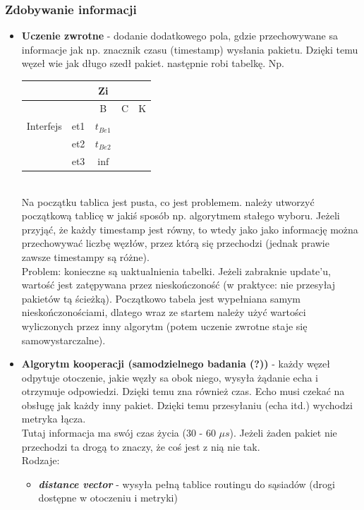 			\subsubsection{Zdobywanie informacji}
				\begin{itemize}
					\item \textbf{Uczenie zwrotne} - dodanie dodatkowego pola, gdzie przechowywane sa informacje jak np. znacznik czasu (timestamp) wysłania pakietu. Dzięki temu węzeł wie jak długo szedł pakiet. następnie robi tabelkę. Np.\\
					\begin{tabular}{|c|c|c|c|c|}
						\hline  &  & Zi &  &  \\
						\hline  &  & B & C & K \\ 
						\hline Interfejs & et1 & $ t_{Be1} $ &  &  \\ 
						\hline  & et2 & $ t_{Be2} $  & & \\ 
						\hline  & et3 & $ \inf $ &  &  \\ 
						\hline 
					\end{tabular}\\
					Na początku tablica jest pusta, co jest problemem. należy utworzyć początkową tablicę w jakiś sposób np. algorytmem stałego wyboru. Jeżeli przyjąć, że każdy timestamp jest równy, to wtedy jako jako informację można przechowywać liczbę węzłów, przez którą się przechodzi (jednak prawie zawsze timestampy są różne). \\
					Problem: konieczne są uaktualnienia tabelki. Jeżeli zabraknie update'u, wartość jest zatępywana przez nieskończoność (w praktyce: nie przesyłaj pakietów tą ścieżką). Początkowo tabela jest wypełniana samym nieskończonościami, dlatego wraz ze startem należy użyć wartości wyliczonych przez inny algorytm (potem uczenie zwrotne staje się samowystarczalne).
					\item \textbf{Algorytm kooperacji (samodzielnego badania (?))} - każdy węzeł odpytuje otoczenie, jakie węzły sa obok niego, wysyła żądanie echa i otrzymuje odpowiedzi. Dzięki temu zna również czas. Echo musi czekać na obsługę jak każdy inny pakiet. Dzięki temu przesyłaniu (echa itd.) wychodzi metryka łącza.\\
					Tutaj informacja ma swój czas życia (30 - 60 $ \mu s $). Jeżeli żaden pakiet nie przechodzi ta drogą to znaczy, że coś jest z nią nie tak.\\
					Rodzaje:
					\begin{itemize}
						\item \textbf{\emph{distance vector}} - wysyła pełną tablice routingu do sąsiadów (drogi dostępne w otoczeniu i metryki)

\end{itemize}
\end{itemize}

